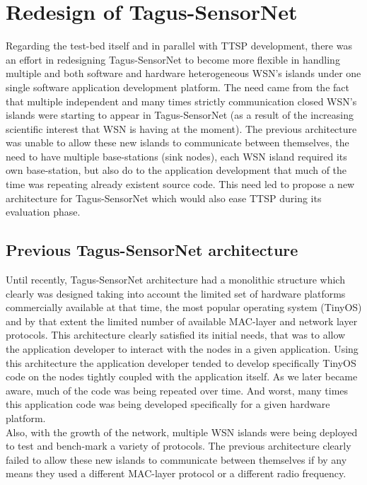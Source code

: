 \section{Redesign of Tagus-SensorNet}
Regarding the test-bed itself and in parallel with TTSP development, there was an effort in redesigning Tagus-SensorNet to become more flexible in handling multiple and both software and hardware heterogeneous WSN's islands under one single software application development platform. The need came from the fact that multiple independent and many times strictly communication closed WSN's islands were starting to appear in Tagus-SensorNet (as a result of the increasing scientific interest that WSN is having at the moment). The previous architecture was unable to allow these new islands to communicate between themselves, the need to have multiple base-stations (sink nodes), each WSN island required its own base-station, but also do to the application development that much of the time was repeating already existent source code. This need led to propose a new architecture for Tagus-SensorNet which would also ease TTSP during its evaluation phase.

\subsection{Previous Tagus-SensorNet architecture}
Until recently, Tagus-SensorNet architecture had a monolithic structure which clearly was designed taking into account the limited set of hardware platforms commercially available at that time, the most popular operating system (TinyOS) and by that extent the limited number of available MAC-layer and network layer protocols. This architecture clearly satisfied its initial needs, that was to allow the application developer to interact with the nodes in a given application. Using this architecture the application developer tended to develop specifically TinyOS code on the nodes tightly coupled with the application itself. As we later became aware, much of the code was being repeated over time. And worst, many times this application code was being developed specifically for a given hardware platform.\\
Also, with the growth of the network, multiple WSN islands were being deployed to test and bench-mark a variety of protocols. The previous architecture clearly failed to allow these new islands to communicate between themselves if by any means they used a different MAC-layer protocol or a different radio frequency.


